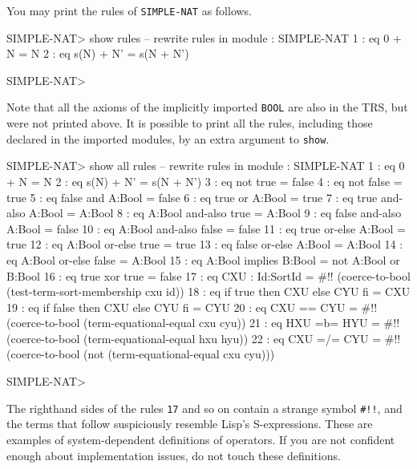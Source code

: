 \documentclass[a4paper]{memoir}
\begin{document}
You may print the rules of \verb|SIMPLE-NAT| as follows.
\begin{vvtm}
\begin{ccode}
  SIMPLE-NAT> show rules
   -- rewrite rules in module : SIMPLE-NAT
    1 : eq 0 + N = N
    2 : eq s(N) + N' = s(N + N')

  SIMPLE-NAT> 
\end{ccode}
\end{vvtm}
Note that all the axioms of the implicitly imported \verb|BOOL|
are also in the TRS, but were not printed above. It is possible to
print all the rules, including those declared in the imported modules,
by an extra argument to \verb|show|.
\begin{vvtm}
\begin{ccode}
  SIMPLE-NAT> show all rules
   -- rewrite rules in module : SIMPLE-NAT
    1 : eq 0 + N = N
    2 : eq s(N) + N' = s(N + N')
    3 : eq not true = false
    4 : eq not false = true
    5 : eq false and A:Bool = false
    6 : eq true or A:Bool = true
    7 : eq true and-also A:Bool = A:Bool
    8 : eq A:Bool and-also true = A:Bool
    9 : eq false and-also A:Bool = false
   10 : eq A:Bool and-also false = false
   11 : eq true or-else A:Bool = true
   12 : eq A:Bool or-else true = true
   13 : eq false or-else A:Bool = A:Bool
   14 : eq A:Bool or-else false = A:Bool
   15 : eq A:Bool implies B:Bool = not A:Bool or B:Bool
   16 : eq true xor true = false
   17 : eq CXU : Id:SortId = #!! (coerce-to-bool
                                  (test-term-sort-membership cxu id))
   18 : eq if true then CXU else CYU fi = CXU
   19 : eq if false then CXU else CYU fi = CYU
   20 : eq CXU == CYU = #!! (coerce-to-bool (term-equational-equal cxu cyu))
   21 : eq HXU =b= HYU = #!! (coerce-to-bool (term-equational-equal hxu hyu))
   22 : eq CXU =/= CYU = #!! (coerce-to-bool
                              (not (term-equational-equal cxu cyu)))

  SIMPLE-NAT> 
\end{ccode}
\end{vvtm}

\begin{warning}
  The righthand sides of the rules \verb|17| and so on contain
  a strange symbol \verb|#!!|, and the terms that follow
  suspiciously resemble Lisp's S-expressions. These are examples of
  system-dependent definitions of operators. If you are not
  confident enough about implementation issues, do not touch
  these definitions.
\end{warning}
\end{document}
